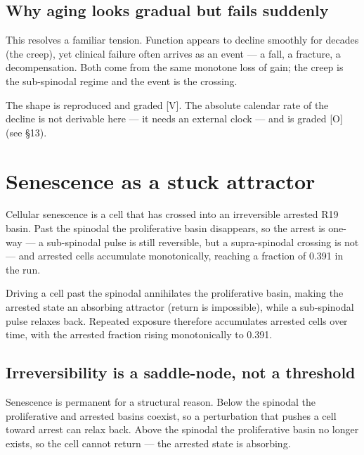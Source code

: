 \documentclass[11pt]{article}
\begin{document}
\subsection*{Why aging looks gradual but fails suddenly}

This resolves a familiar tension. Function appears to decline smoothly for decades (the creep), yet clinical failure often arrives as an event — a fall, a fracture, a decompensation. Both come from the same monotone loss of gain; the creep is the sub-spinodal regime and the event is the crossing.

The shape is reproduced and graded [V]. The absolute calendar rate of the decline is not derivable here — it needs an external clock — and is graded [O] (see §13).

\section{Senescence as a stuck attractor}

\begin{answerbox}Cellular senescence is a cell that has crossed into an irreversible arrested R19 basin. Past the spinodal the proliferative basin disappears, so the arrest is one-way — a sub-spinodal pulse is still reversible, but a supra-spinodal crossing is not — and arrested cells accumulate monotonically, reaching a fraction of 0.391 in the run.\end{answerbox}

\begin{abstractbox}Driving a cell past the spinodal annihilates the proliferative basin, making the arrested state an absorbing attractor (return is impossible), while a sub-spinodal pulse relaxes back. Repeated exposure therefore accumulates arrested cells over time, with the arrested fraction rising monotonically to 0.391.\end{abstractbox}

\subsection*{Irreversibility is a saddle-node, not a threshold}

Senescence is permanent for a structural reason. Below the spinodal the proliferative and arrested basins coexist, so a perturbation that pushes a cell toward arrest can relax back. Above the spinodal the proliferative basin no longer exists, so the cell cannot return — the arrested state is absorbing.
\end{document}
